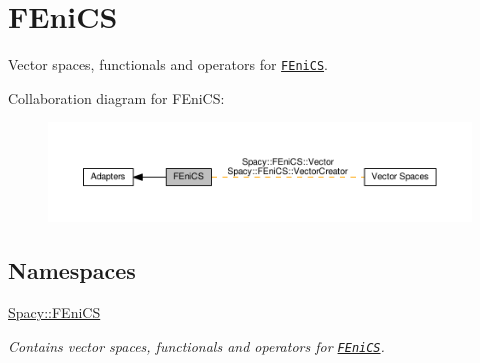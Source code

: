 \hypertarget{group__FenicsGroup}{}\section{F\+Eni\+CS}
\label{group__FenicsGroup}


Vector spaces, functionals and operators for \href{http://www.fenicsproject.org}{\tt F\+Eni\+CS}.  


Collaboration diagram for F\+Eni\+CS\+:
\nopagebreak
\begin{figure}[H]
\begin{center}
\leavevmode
\includegraphics[width=350pt]{group__FenicsGroup}
\end{center}
\end{figure}
\subsection*{Namespaces}
\begin{DoxyCompactItemize}
\item 
 \hyperlink{namespaceSpacy_1_1FEniCS}{Spacy\+::\+F\+Eni\+CS}
\begin{DoxyCompactList}\small\item\em Contains vector spaces, functionals and operators for \href{www.fenicsproject.org}{\tt F\+Eni\+CS}. \end{DoxyCompactList}\end{DoxyCompactItemize}
